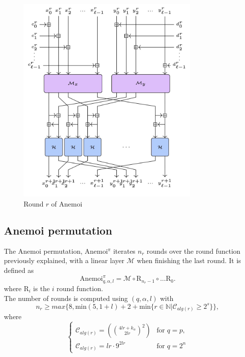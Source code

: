 \begin{figure}[htbp]
    \centering
    \includegraphics[width=0.8\textwidth]{graphics/anemoi-one-round.png}
    \caption{Round $r$ of Anemoi~\cite{bouvier2023new}}
    \label{fig:anemoi-one-round}
\end{figure}

\subsection*{Anemoi permutation}
The Anemoi permutation, Anemoi$^\pi$ iterates $n_r$ rounds over the round function previously explained, with a linear layer $\mathcal{M}$ when finishing the last round. It is defined as
\begin{equation}
    \text{Anemoi}^\pi_{q,\alpha,l}=\mathcal{M}\circ \text{R}_{n_r-1}\circ\dots \text{R}_0.
\end{equation}
where R$_i$ is the $i$ round function.\\
The number of rounds is computed using $\left(q,\alpha,l\right)$ with
\begin{equation}
    n_r\geq max\{
        8,\text{min}\left(5,1+l\right)+2+\text{min}\{r\in\mathbb{N}|\mathcal{C}_{alg(r)}\geq2^s\}\},
\end{equation}
where
\begin{equation}
    \begin{cases}
        \mathcal{C}_{alg(r)}=\left(\binom{4lr+k_\alpha}{2lr}^2\right) & \text{for } q=p, \\
        \mathcal{C}_{alg(r)}=lr\cdot9^{2lr} & \text{for } q=2^n
    \end{cases}
\end{equation}

